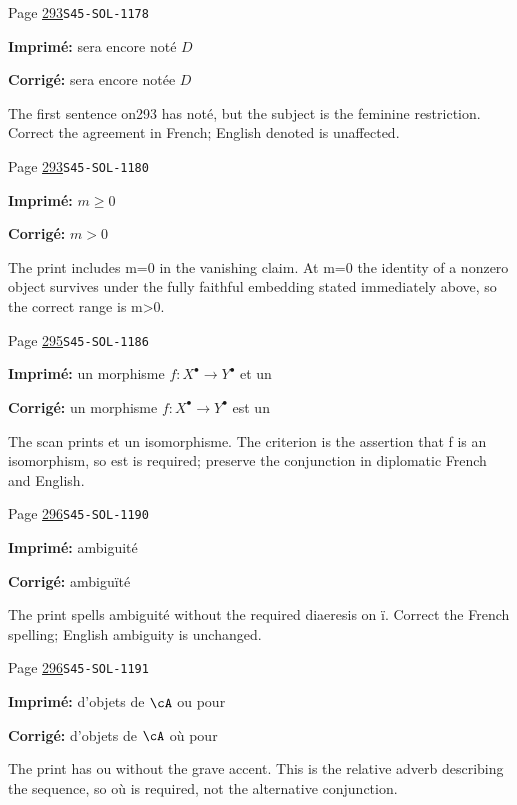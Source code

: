 \begin{description}
\smallskip
\item[\hypertarget{apparatus:FR-0294}{294}] Page \hyperlink{printpage:fr:293}{293}\quad\texttt{S45-SOL-1178}
\par\noindent\textbf{Imprimé:} sera encore noté $D$
\par\noindent\textbf{Corrigé:} sera encore notée $D$
\par\noindent The first sentence on293 has noté, but the subject is the feminine restriction. Correct the agreement in French; English denoted is unaffected.
\smallskip
\item[\hypertarget{apparatus:FR-0295}{295}] Page \hyperlink{printpage:fr:293}{293}\quad\texttt{S45-SOL-1180}
\par\noindent\textbf{Imprimé:} $m\geqslant 0$
\par\noindent\textbf{Corrigé:} $m>0$
\par\noindent The print includes m=0 in the vanishing claim. At m=0 the identity of a nonzero object survives under the fully faithful embedding stated immediately above, so the correct range is m>0.
\smallskip
\item[\hypertarget{apparatus:FR-0296}{296}] Page \hyperlink{printpage:fr:295}{295}\quad\texttt{S45-SOL-1186}
\par\noindent\textbf{Imprimé:} un morphisme $f:X^\bullet \to Y^\bullet$ et un
\par\noindent\textbf{Corrigé:} un morphisme $f:X^\bullet \to Y^\bullet$ est un
\par\noindent The scan prints et un isomorphisme. The criterion is the assertion that f is an isomorphism, so est is required; preserve the conjunction in diplomatic French and English.
\smallskip
\item[\hypertarget{apparatus:FR-0297}{297}] Page \hyperlink{printpage:fr:296}{296}\quad\texttt{S45-SOL-1190}
\par\noindent\textbf{Imprimé:} ambiguité
\par\noindent\textbf{Corrigé:} ambiguïté
\par\noindent The print spells ambiguité without the required diaeresis on ï. Correct the French spelling; English ambiguity is unchanged.
\smallskip
\item[\hypertarget{apparatus:FR-0298}{298}] Page \hyperlink{printpage:fr:296}{296}\quad\texttt{S45-SOL-1191}
\par\noindent\textbf{Imprimé:} d'objets de $\cA$ ou pour
\par\noindent\textbf{Corrigé:} d'objets de $\cA$ où pour
\par\noindent The print has ou without the grave accent. This is the relative adverb describing the sequence, so où is required, not the alternative conjunction.

\end{description}
